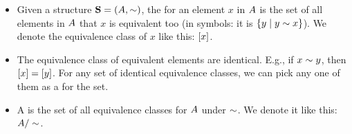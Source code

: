 \documentclass[../../../main.tex]{subfiles}
\begin{document}
\begin{itemize}
  \item Given a structure $\struct{S} = (\set{A}, \equivalence/)$, the  for an element $x$ in $A$ is the set of all elements in $A$ that $x$ is equivalent too (in symbols: it is $\{ y \mid y \equivalence/ x \}$). We denote the equivalence class of $x$ like this: $[x]$.
  \item The equivalence class of equivalent elements are identical. E.g., if $x \equivalence/ y$, then $[x] = [y]$. For any set of identical equivalence classes, we can pick any one of them as a  for the set.
  \item A  is the set of all equivalence classes for $A$ under $\equivalence/$. We denote it like this: $\quotientset{\set{A}}{\equivalence/}$.
\end{itemize} 
\end{document}
